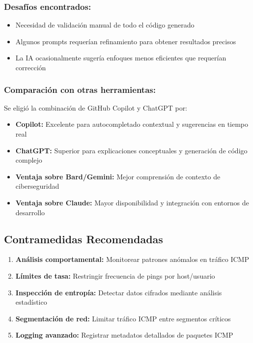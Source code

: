 \documentclass[letter,12pt]{article}
\begin{document}
\subsubsection*{Desafíos encontrados:}
\begin{itemize}
    \item Necesidad de validación manual de todo el código generado
    
    \item Algunos prompts requerían refinamiento para obtener resultados precisos
    
    \item La IA ocasionalmente sugería enfoques menos eficientes que requerían corrección
\end{itemize}

\subsubsection*{Comparación con otras herramientas:}
Se eligió la combinación de GitHub Copilot y ChatGPT por:
\begin{itemize}
    \item \textbf{Copilot:} Excelente para autocompletado contextual y sugerencias en tiempo real
    
    \item \textbf{ChatGPT:} Superior para explicaciones conceptuales y generación de código complejo
    
    \item \textbf{Ventaja sobre Bard/Gemini:} Mejor comprensión de contexto de ciberseguridad
    
    \item \textbf{Ventaja sobre Claude:} Mayor disponibilidad y integración con entornos de desarrollo
\end{itemize}

\subsection*{Contramedidas Recomendadas}

\begin{enumerate}
    \item \textbf{Análisis comportamental:} Monitorear patrones anómalos en tráfico ICMP
    
    \item \textbf{Límites de tasa:} Restringir frecuencia de pings por host/usuario
    
    \item \textbf{Inspección de entropía:} Detectar datos cifrados mediante análisis estadístico
    
    \item \textbf{Segmentación de red:} Limitar tráfico ICMP entre segmentos críticos
    
    \item \textbf{Logging avanzado:} Registrar metadatos detallados de paquetes ICMP
\end{enumerate}
\end{document}
